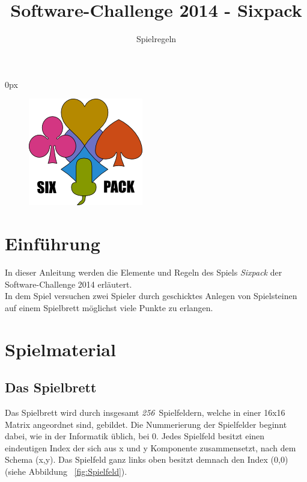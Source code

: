 \documentclass[a4paper, ngerman]{scrartcl}
\title{Software-Challenge 2014 - Sixpack}
\subtitle{Spielregeln}
\newcommand{\SpielFelderAnzahl}{\emph{256}}
\begin{document}
\parindent0px
\maketitle

\begin{figure}[h]
	\centering
	\includegraphics[scale = 1.0]{images/sixpack}
\end{figure}
\vspace*{\fill}

\newpage
\tableofcontents
\newpage

\section{Einführung}
In dieser Anleitung werden die Elemente und Regeln des Spiels \emph{Sixpack}
der Software-Challenge 2014 erläutert.\\
In dem Spiel versuchen zwei Spieler durch geschicktes Anlegen von Spielsteinen auf einem Spielbrett möglichst viele Punkte zu erlangen.

\section{Spielmaterial}
	\subsection{Das Spielbrett}
Das Spielbrett wird durch insgesamt \SpielFelderAnzahl\ Spielfeldern, welche in einer 16x16 Matrix angeordnet sind, gebildet. Die Nummerierung der Spielfelder beginnt dabei, wie in der Informatik üblich, bei 0. Jedes Spielfeld besitzt einen eindeutigen Index der sich aus x und y Komponente zusammensetzt, nach dem Schema (x,y). Das Spielfeld ganz links oben besitzt demnach den Index (0,0) (siehe Abbildung ~\ref{fig:Spielfeld}).\\
\end{document}
